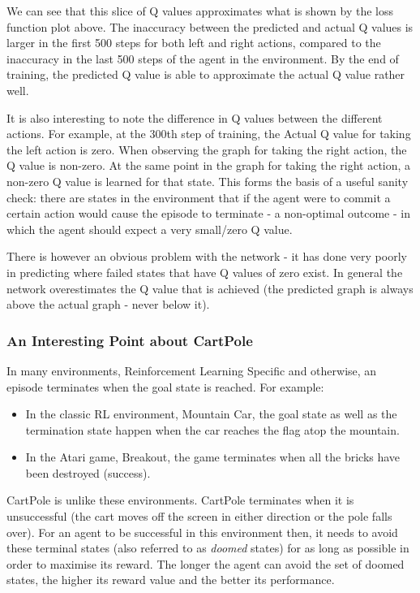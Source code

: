 \documentclass{article}
\begin{document}
We can see that this slice of Q values approximates what is shown by the loss function plot above. The inaccuracy between the predicted and actual Q values is larger in the first 500 steps for both left and right actions, compared to the inaccuracy in the last 500 steps of the agent in the environment. By the end of training, the predicted Q value is able to approximate the actual Q value rather well. 

It is also interesting to note the difference in Q values between the different actions. For example, at the 300th step of training, the Actual Q value for taking the left action is zero. When observing the graph for taking the right action, the Q value is non-zero. At the same point in the graph for taking the right action, a non-zero Q value is learned for that state. This forms the basis of a useful sanity check: there are states in the environment that if the agent were to commit a certain action would cause the episode to terminate - a non-optimal outcome - in which the agent should expect a very small/zero Q value. 

There is however an obvious problem with the network - it has done very poorly in predicting where failed states that have Q values of zero exist. In general the network overestimates the Q value that is achieved (the predicted graph is always above the actual graph - never below it). 

\subsubsection{An Interesting Point about CartPole}

In many environments, Reinforcement Learning Specific and otherwise, an episode terminates when the goal state is reached. For example: 

\begin{itemize}
    \item In the classic RL environment, Mountain Car\cite{brockman2016openai}, the goal state as well as the termination state happen when the car reaches the flag atop the mountain.
    
    \item In the Atari game, Breakout, the game terminates when all the bricks have been destroyed (success).
\end{itemize}

CartPole is unlike these environments. CartPole terminates when it is unsuccessful (the cart moves off the screen in either direction or the pole falls over). For an agent to be successful in this environment then, it needs to avoid these terminal states (also referred to as \textit{doomed} states) for as long as possible in order to maximise its reward. The longer the agent can avoid the set of doomed states, the higher its reward value and the better its performance. 
\end{document}
